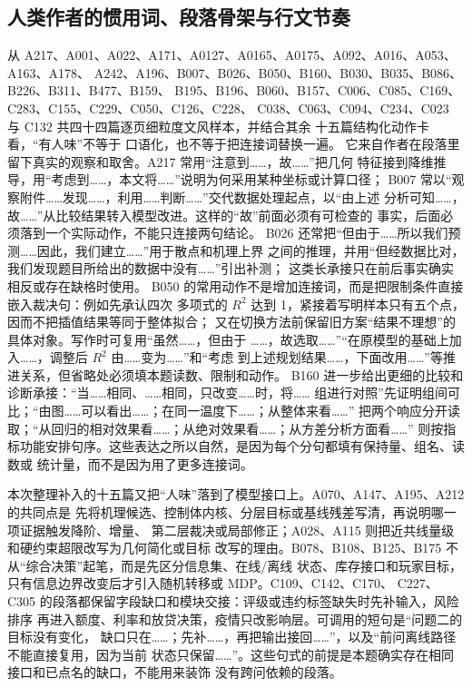 \subsection{人类作者的惯用词、段落骨架与行文节奏}

从 A217、A001、A022、A171、A0127、A0165、A0175、A092、A016、A053、A163、A178、
A242、A196、B007、B026、B050、B160、B030、B035、B086、B226、B311、B477、B159、
B195、B196、B060、B157、C006、C085、C169、C283、C155、C229、C050、C126、C228、
C038、C063、C094、C234、C023 与 C132 共四十四篇逐页细粒度文风样本，并结合其余
十五篇结构化动作卡看，“有人味”不等于
口语化，也不等于把连接词替换一遍。
它来自作者在段落里留下真实的观察和取舍。A217 常用“注意到……，故……”把几何
特征接到降维推导，用“考虑到……，本文将……”说明为何采用某种坐标或计算口径；
B007 常以“观察附件……发现……，利用……判断……”交代数据处理起点，以“由上述
分析可知……，故……”从比较结果转入模型改进。这样的“故”前面必须有可检查的
事实，后面必须落到一个实际动作，不能只连接两句结论。
B026 还常把“但由于……所以我们预测……因此，我们建立……”用于散点和机理上界
之间的推理，并用“但经数据比对，我们发现题目所给出的数据中没有……”引出补测；
这类长承接只在前后事实确实相反或存在缺格时使用。
B050 的常用动作不是增加连接词，而是把限制条件直接嵌入裁决句：例如先承认四次
多项式的 $R^2$ 达到 1，紧接着写明样本只有五个点，因而不把插值结果等同于整体拟合；
又在切换方法前保留旧方案“结果不理想”的具体对象。写作时可复用“虽然……，但由于
……，故选取……”“在原模型的基础上加入……，调整后 $R^2$ 由……变为……”和“考虑
到上述规划结果……，下面改用……”等推进关系，但省略处必须填本题读数、限制和动作。
B160 进一步给出更细的比较和诊断承接：“当……相同、……相同，只改变……时，将……
组进行对照”先证明组间可比；“由图……可以看出……；在同一温度下……；从整体来看……”
把两个响应分开读取；“从回归的相对效果看……；从绝对效果看……；从方差分析方面看……”
则按指标功能安排句序。这些表达之所以自然，是因为每个分句都填有保持量、组名、读数或
统计量，而不是因为用了更多连接词。

本次整理补入的十五篇又把“人味”落到了模型接口上。A070、A147、A195、A212 的共同点是
先将机理候选、控制体内核、分层目标或基线残差写清，再说明哪一项证据触发降阶、增量、
第二层裁决或局部修正；A028、A115 则把近共线量级和硬约束超限改写为几何简化或目标
改写的理由。B078、B108、B125、B175 不从“综合决策”起笔，而是先区分信息集、在线/离线
状态、库存接口和玩家目标，只有信息边界改变后才引入随机转移或 MDP。C109、C142、C170、
C227、C305 的段落都保留字段缺口和模块交接：评级或违约标签缺失时先补输入，风险排序
再进入额度、利率和放贷决策，疫情只改影响层。可调用的短句是“问题二的目标没有变化，
缺口只在……；先补……，再把输出接回……”，以及“前问离线路径不能直接复用，因为当前
状态只保留……”。这些句式的前提是本题确实存在相同接口和已点名的缺口，不能用来装饰
没有跨问依赖的段落。


